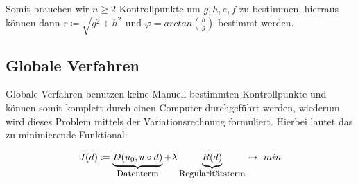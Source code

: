 \documentclass{article}
\theoremstyle{plain}
\theoremstyle{definition}
\numberwithin{equation}{section}
\begin{document}
Somit brauchen wir $n \geq 2$ Kontrollpunkte um $g,h,e,f$ zu bestimmen, hierraus können dann $r \coloneqq \sqrt{g^2+h^2}$ und $\varphi=arctan(\frac{h}{g})$ bestimmt werden.

\subsection{Globale Verfahren}

Globale Verfahren benutzen keine Manuell bestimmten Kontrollpunkte und können somit komplett durch einen Computer durchgeführt werden, wiederum wird dieses Problem mittels der Variationsrechnung formuliert.
Hierbei lautet das zu minimierende Funktional:

\[J(d) \coloneqq \underbrace{D(u_0,u \circ d)}_{\text{\small Datenterm}} + \lambda \underbrace{R(d)}_{\text{\small Regularitätsterm}} \to \ min\]
\end{document}
